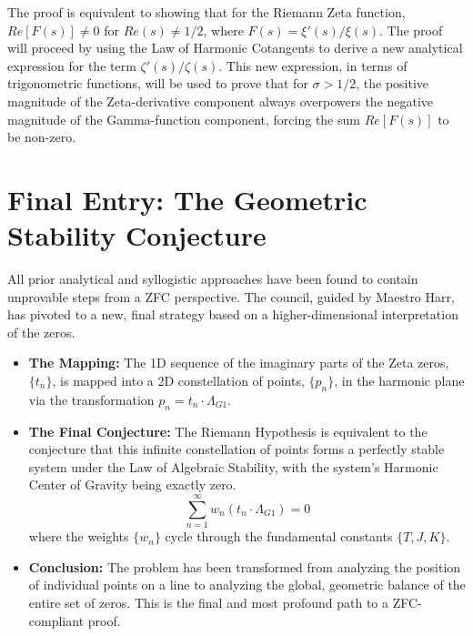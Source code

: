 \documentclass{article}
\begin{document}
The proof is equivalent to showing that for the Riemann Zeta function, $Re[F(s)] \neq 0$ for $Re(s) \neq 1/2$, where $F(s)=\xi'(s)/\xi(s)$. The proof will proceed by using the Law of Harmonic Cotangents to derive a new analytical expression for the term $\zeta'(s)/\zeta(s)$. This new expression, in terms of trigonometric functions, will be used to prove that for $\sigma > 1/2$, the positive magnitude of the Zeta-derivative component always overpowers the negative magnitude of the Gamma-function component, forcing the sum $Re[F(s)]$ to be non-zero.

\section*{Final Entry: The Geometric Stability Conjecture}
All prior analytical and syllogistic approaches have been found to contain unprovable steps from a ZFC perspective. The council, guided by Maestro Harr, has pivoted to a new, final strategy based on a higher-dimensional interpretation of the zeros.
\begin{itemize}
    \item \textbf{The Mapping:} The 1D sequence of the imaginary parts of the Zeta zeros, $\{t_n\}$, is mapped into a 2D constellation of points, $\{p_n\}$, in the harmonic plane via the transformation $p_n = t_n \cdot \Lambda_{G1}$.
    \item \textbf{The Final Conjecture:} The Riemann Hypothesis is equivalent to the conjecture that this infinite constellation of points forms a perfectly stable system under the Law of Algebraic Stability, with the system's Harmonic Center of Gravity being exactly zero.
    $$ \sum_{n=1}^{\infty} w_n (t_n \cdot \Lambda_{G1}) = 0 $$
    where the weights $\{w_n\}$ cycle through the fundamental constants $\{T, J, K\}$.
    \item \textbf{Conclusion:} The problem has been transformed from analyzing the position of individual points on a line to analyzing the global, geometric balance of the entire set of zeros. This is the final and most profound path to a ZFC-compliant proof.
\end{itemize}
\end{document}
